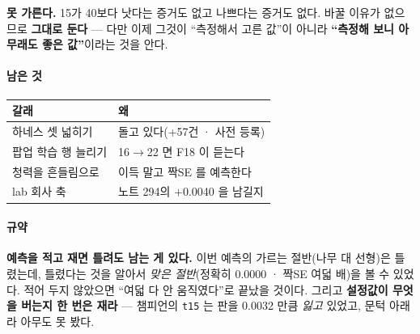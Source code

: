 \documentclass[10pt]{article}
\begin{document}
\textbf{못 가른다.} 15가 40보다 낫다는 증거도 없고 나쁘다는 증거도 없다.
바꿀 이유가 없으므로 \textbf{그대로 둔다} --- 다만 이제 그것이 ``측정해서
고른 값''이 아니라 \textbf{``측정해 보니 아무래도 좋은 값''}이라는 것을 안다.

\paragraph{남은 것}
\begin{center}\small
\begin{tabular}{ll}
\hline
갈래 & 왜 \\
\hline
하네스 셋 넓히기 & 돌고 있다(+57건 · 사전 등록) \\
팝업 학습 행 늘리기 & 16$\to$22 면 F18 이 듣는다 \\
청력을 흔들림으로 & 이득 말고 짝SE 를 예측한다 \\
lab 회사 축 & 노트 294의 $+$0.0040 을 남길지 \\
\hline
\end{tabular}
\end{center}

\paragraph{규약} \textbf{예측을 적고 재면 틀려도 남는 게 있다.} 이번 예측의
가르는 절반(나무 대 선형)은 틀렸는데, 틀렸다는 것을 알아서 \emph{맞은
절반}(정확히 0.0000 · 짝SE 여덟 배)을 볼 수 있었다. 적어 두지 않았으면
``여덟 다 안 움직였다''로 끝났을 것이다. 그리고 \textbf{설정값이 무엇을 버는지
한 번은 재라} --- 챔피언의 \texttt{t15} 는 판을 0.0032 만큼 \emph{잃고}
있었고, 문턱 아래라 아무도 못 봤다.
\end{document}
